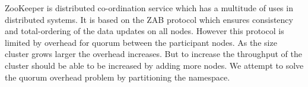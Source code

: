 ZooKeeper is distributed co-ordination service which has a multitude of uses in distributed systems. It is based on the ZAB protocol which ensures consistency and total-ordering of the data updates on all nodes. However this protocol is limited by overhead for quorum between the participant nodes. As the size cluster grows larger the overhead increases. But to increase the throughput of the cluster should be able to be increased by adding more nodes. We attempt to solve the quorum overhead problem by partitioning the namespace.
